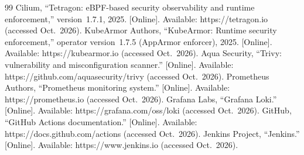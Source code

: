 \documentclass[10pt,conference]{IEEEtran}
\begin{document}
\begin{thebibliography}{99}
 Cilium, ``Tetragon: eBPF-based security observability and runtime enforcement,'' version~1.7.1, 2025. [Online]. Available: https://tetragon.io (accessed Oct.~2026).
 KubeArmor Authors, ``KubeArmor: Runtime security enforcement,'' operator version~1.7.5 (AppArmor enforcer), 2025. [Online]. Available: https://kubearmor.io (accessed Oct.~2026).
 Aqua Security, ``Trivy: vulnerability and misconfiguration scanner.'' [Online]. Available: https://github.com/aquasecurity/trivy (accessed Oct.~2026).
 Prometheus Authors, ``Prometheus monitoring system.'' [Online]. Available: https://prometheus.io (accessed Oct.~2026).
 Grafana Labs, ``Grafana Loki.'' [Online]. Available: https://grafana.com/oss/loki (accessed Oct.~2026).
 GitHub, ``GitHub Actions documentation.'' [Online]. Available: https://docs.github.com/actions (accessed Oct.~2026).
 Jenkins Project, ``Jenkins.'' [Online]. Available: https://www.jenkins.io (accessed Oct.~2026).
\end{thebibliography}
\end{document}
